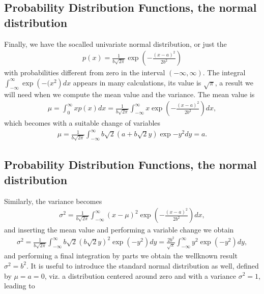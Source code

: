 \documentclass[letterpaper,10pt,english]{sphinxmanual}
\begin{document}
\subsection{Probability Distribution Functions, the normal distribution}
\label{\detokenize{chapter2:probability-distribution-functions-the-normal-distribution}}
Finally, we have the so\sphinxhyphen{}called univariate normal  distribution, or just the 
\begin{equation*}
\begin{split}
p(x)=\frac{1}{b\sqrt{2\pi}}\exp{\left(-\frac{(x-a)^2}{2b^2}\right)}
\end{split}
\end{equation*}
with probabilities different from zero in the interval \((-\infty,\infty)\).
The integral \(\int_{-\infty}^{\infty}\exp{\left(-(x^2\right)}dx\) appears in many calculations, its value
is \(\sqrt{\pi}\),  a result we will need when we compute the mean value and the variance.
The mean value is
\begin{equation*}
\begin{split}
\mu = \int_0^{\infty}xp(x)dx=\frac{1}{b\sqrt{2\pi}}\int_{-\infty}^{\infty}x \exp{\left(-\frac{(x-a)^2}{2b^2}\right)}dx,
\end{split}
\end{equation*}
which becomes with a suitable change of variables
\begin{equation*}
\begin{split}
\mu =\frac{1}{b\sqrt{2\pi}}\int_{-\infty}^{\infty}b\sqrt{2}(a+b\sqrt{2}y)\exp{-y^2}dy=a.
\end{split}
\end{equation*}

\subsection{Probability Distribution Functions, the normal distribution}
\label{\detokenize{chapter2:id2}}
Similarly, the variance becomes
\begin{equation*}
\begin{split}
\sigma^2 = \frac{1}{b\sqrt{2\pi}}\int_{-\infty}^{\infty}(x-\mu)^2 \exp{\left(-\frac{(x-a)^2}{2b^2}\right)}dx,
\end{split}
\end{equation*}
and inserting the mean value and performing a variable change we obtain
\begin{equation*}
\begin{split}
\sigma^2 = \frac{1}{b\sqrt{2\pi}}\int_{-\infty}^{\infty}b\sqrt{2}(b\sqrt{2}y)^2\exp{\left(-y^2\right)}dy=
\frac{2b^2}{\sqrt{\pi}}\int_{-\infty}^{\infty}y^2\exp{\left(-y^2\right)}dy,
\end{split}
\end{equation*}
and performing a final integration by parts we obtain the well\sphinxhyphen{}known result \(\sigma^2=b^2\).
It is useful to introduce the standard normal distribution as well, defined by \(\mu=a=0\), viz. a distribution
centered around zero and with a variance \(\sigma^2=1\), leading to
\end{document}

